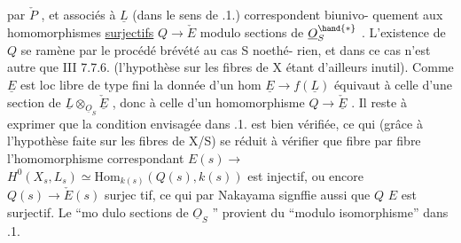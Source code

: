 
par $\check{P}$ , et associés à $\underline{L}$ (dans le sens de \hand{\S}.1.) correspondent biunivo-%
quement aux\hand{*} homomorphismes \uline{surjectifs} $Q\longrightarrow\check{E}$\hand{,} modulo  sections de $\underline{O}_S^{\hand{*}}$ .\hand{\unsure{$\blacktriangledown$}}
L'existence de $Q$ se ramène par le procédé brévété au cas S noethé-%
rien, et dans ce cas n'est autre que III 7.7.6. (l'hypothèse sur les
fibres de X étant d'ailleurs inutil). Comme $\underline{E}$ est loc libre de type fini
la donnée d'un hom $\underline{E}\longrightarrow f(\underline{L})$ équivaut à celle d'une section de
$\underline{L}\otimes_{\underline{O}_S}\check{\underline{E}}$ , donc à celle d'un homomorphisme $Q\longrightarrow\check{\underline{E}}$ . Il reste à exprimer
que la condition envisagée dans \hand{\S}.1. est bien vérifiée, ce qui (grâce à
l'hypothèse faite sur les fibres de X/S) se réduit à vérifier que
fibre par fibre l'homomorphisme correspondant $E(s)\longrightarrow$ \hand{$\vee$}
$H^0(X_s,L_s)\simeq\mathrm{Hom}_{k(s)}(Q(s),k(s))$ est injectif, ou encore $Q(s)\longrightarrow\check{E}(s)$ surjec%
tif, ce qui par Nakayama signffie aussi que $Q$ \quad $E$ est surjectif. Le ``mo
dulo sections de $\underline{O}_S$ '' provient du ``modulo isomorphisme'' dans \hand{\S}.1.\hand{/}

